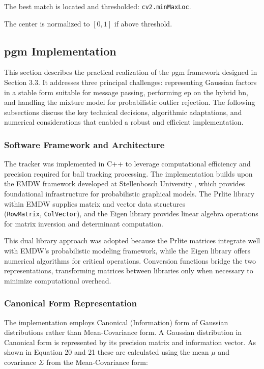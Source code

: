 \documentclass[12pt,a4paper]{article}
\begin{document}
The best match is located and thresholded: \texttt{cv2.minMaxLoc}.

The center is normalized to $[0,1]$ if above threshold.

\subsection{\acs{pgm} Implementation}
This section describes the practical realization of the \acs{pgm} framework designed in Section 3.3. It addresses three principal challenges: representing Gaussian factors in a stable form suitable for message passing, performing \acs{ep} on the hybrid \acs{bn}, and handling the mixture model for probabilistic outlier rejection. The following subsections discuss the key technical decisions, algorithmic adaptations, and numerical considerations that enabled a robust and efficient implementation.

\subsubsection{Software Framework and Architecture}
The tracker was implemented in C++ to leverage computational efficiency and precision required for ball tracking processing. The implementation builds upon the EMDW framework developed at Stellenbosch University \parencite{emdw_repo}, which provides foundational infrastructure for probabilistic graphical models. The Prlite library within EMDW supplies matrix and vector data structures \\(\texttt{RowMatrix}, \texttt{ColVector}), and the Eigen library provides linear algebra operations for matrix inversion and determinant computation.

This dual library approach was adopted because the Prlite matrices integrate well with EMDW's probabilistic modeling framework, while the Eigen library offers numerical algorithms for critical operations. Conversion functions bridge the two representations, transforming matrices between libraries only when necessary to minimize computational overhead.

\subsubsection{Canonical Form Representation}
The implementation employs Canonical (Information) form of Gaussian distributions rather than Mean-Covariance form. A Gaussian distribution in Canonical form is represented by its precision matrix and information vector. As shown in Equation 20 and 21 these are calculated using the mean $\mu$ and covariance $\Sigma$ from the Mean-Covariance form:
\end{document}
